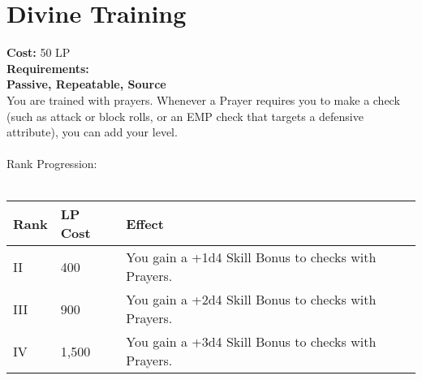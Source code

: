 \section{Divine Training}\label{perk:divineTraining}
\textbf{Cost:} 50 LP\\
\textbf{Requirements:}~\\
\textbf{Passive, Repeatable, Source}\\
You are trained with prayers.
Whenever a Prayer requires you to make a check (such as attack or block rolls, or an EMP check that targets a defensive attribute), you can add your level.\\
\\
Rank Progression:\\
\\
\begin{longtable}{l | l | p{9cm}}
    Rank & LP Cost & Effect\\
    \hline
    II & 400 & You gain a +1d4 Skill Bonus to checks with Prayers.\\
    III & 900 & You gain a +2d4 Skill Bonus to checks with Prayers.\\
    IV & 1,500 & You gain a +3d4 Skill Bonus to checks with Prayers.\\
\end{longtable}